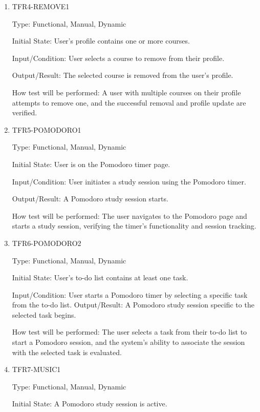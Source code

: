 \documentclass[12pt, titlepage]{article}
\begin{document}
\begin{enumerate}
\item{TFR4-REMOVE1\\}\label{TFR4-REMOVE1}

Type: Functional, Manual, Dynamic

Initial State: User's profile contains one or more courses.

Input/Condition: User selects a course to remove from their profile.

Output/Result: The selected course is removed from the user's profile.

How test will be performed: A user with multiple courses on their profile attempts to remove one, and the successful removal and profile update are verified.

\item{TFR5-POMODORO1\\}\label{TFR5-POMODORO1}

Type: Functional, Manual, Dynamic

Initial State: User is on the Pomodoro timer page.

Input/Condition: User initiates a study session using the Pomodoro timer.

Output/Result: A Pomodoro study session starts.

How test will be performed: The user navigates to the Pomodoro page and starts a study session, verifying the timer's functionality and session tracking.

\item{TFR6-POMODORO2\\}\label{TFR6-POMODORO2}

Type: Functional, Manual, Dynamic

Initial State: User's to-do list contains at least one task.

Input/Condition: User starts a Pomodoro timer by selecting a specific task from the to-do list.
Output/Result: A Pomodoro study session specific to the selected task begins.

How test will be performed: The user selects a task from their to-do list to start a Pomodoro session, and the system's ability to associate the session with the selected task is evaluated.

\item{TFR7-MUSIC1\\}\label{TFR7-MUSIC1}

Type: Functional, Manual, Dynamic

Initial State: A Pomodoro study session is active.


\end{enumerate}
\end{document}
